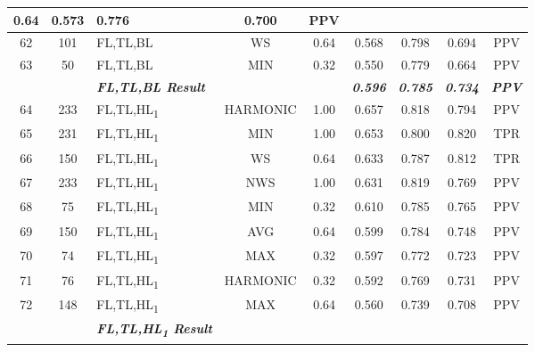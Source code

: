 \begin{table}[H]
{\begin{tabular}{cc|l|cc|c|c|c|c|}
    0.64 &
    0.573 &
    0.776 &
    0.700 &
    PPV \\ \hline
  \multicolumn{1}{|c|}{62} &
    101 &
    FL,TL,BL &
    \multicolumn{1}{c|}{WS} &
    0.64 &
    0.568 &
    0.798 &
    0.694 &
    PPV \\ \hline
  \multicolumn{1}{|c|}{63} &
    50 &
    FL,TL,BL &
    \multicolumn{1}{c|}{MIN} &
    0.32 &
    0.550 &
    0.779 &
    0.664 &
    PPV \\ \hline
   &
     &
    \textit{\textbf{FL,TL,BL Result}} &
     &
     &
    \textit{\textbf{0.596}} &
    \textit{\textbf{0.785}} &
    \textit{\textbf{0.734}} &
    \textit{\textbf{PPV}} \\ \hline
  \multicolumn{1}{|c|}{64} &
    233 &
    FL,TL,HL\textsubscript{1} &
    \multicolumn{1}{c|}{HARMONIC} &
    1.00 &
    0.657 &
    0.818 &
    0.794 &
    PPV \\ \hline
  \multicolumn{1}{|c|}{65} &
    231 &
    FL,TL,HL\textsubscript{1} &
    \multicolumn{1}{c|}{MIN} &
    1.00 &
    0.653 &
    0.800 &
    0.820 &
    TPR \\ \hline
  \multicolumn{1}{|c|}{66} &
    150 &
    FL,TL,HL\textsubscript{1} &
    \multicolumn{1}{c|}{WS} &
    0.64 &
    0.633 &
    0.787 &
    0.812 &
    TPR \\ \hline
  \multicolumn{1}{|c|}{67} &
    233 &
    FL,TL,HL\textsubscript{1} &
    \multicolumn{1}{c|}{NWS} &
    1.00 &
    0.631 &
    0.819 &
    0.769 &
    PPV \\ \hline
  \multicolumn{1}{|c|}{68} &
    75 &
    FL,TL,HL\textsubscript{1} &
    \multicolumn{1}{c|}{MIN} &
    0.32 &
    0.610 &
    0.785 &
    0.765 &
    PPV \\ \hline
  \multicolumn{1}{|c|}{69} &
    150 &
    FL,TL,HL\textsubscript{1} &
    \multicolumn{1}{c|}{AVG} &
    0.64 &
    0.599 &
    0.784 &
    0.748 &
    PPV \\ \hline
  \multicolumn{1}{|c|}{70} &
    74 &
    FL,TL,HL\textsubscript{1} &
    \multicolumn{1}{c|}{MAX} &
    0.32 &
    0.597 &
    0.772 &
    0.723 &
    PPV \\ \hline
  \multicolumn{1}{|c|}{71} &
    76 &
    FL,TL,HL\textsubscript{1} &
    \multicolumn{1}{c|}{HARMONIC} &
    0.32 &
    0.592 &
    0.769 &
    0.731 &
    PPV \\ \hline
  \multicolumn{1}{|c|}{72} &
    148 &
    FL,TL,HL\textsubscript{1} &
    \multicolumn{1}{c|}{MAX} &
    0.64 &
    0.560 &
    0.739 &
    0.708 &
    PPV \\ \hline
   &
     &
    \textit{\textbf{FL,TL,HL\textsubscript{1} Result}} &

\end{tabular}}
\end{table}
